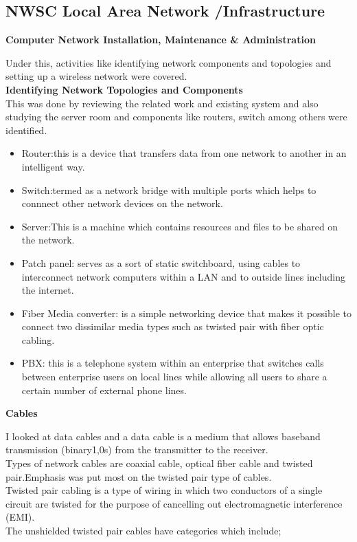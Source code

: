 \documentclass{article}
\begin{document}
\subsection{NWSC Local Area Network /Infrastructure}
\textbf{Computer Network Installation, Maintenance \& Administration}
\par Under this, activities like identifying network components and topologies and setting up a wireless network were covered.\\
\textbf{Identifying Network Topologies and Components}\\
This was done by reviewing the related work and existing system and also studying the server room and components like routers, switch among others were identified.
\begin{itemize}
\item Router:this is a device that transfers data from one network to another in an intelligent way.
\item Switch:termed as a network bridge with multiple ports which helps to connnect other network devices on the network.
\item Server:This is a machine which contains resources and files to be shared on the network.
\item Patch panel: serves as a sort of static switchboard, using cables to interconnect network computers within a LAN and to outside lines including the internet.
\item Fiber Media converter:  is a simple networking device that makes it possible to connect two dissimilar media types such as twisted pair with fiber optic cabling.
\item PBX: this is a telephone system within an enterprise that switches calls between enterprise users on local lines while allowing all users to share a certain number of external phone lines.
\end{itemize}
\textbf{Cables}
\par I looked at data cables and a data cable is a medium that allows baseband transmission (binary1,0s) from the transmitter to the receiver.\\
Types of network cables are coaxial cable, optical fiber cable and twisted pair.Emphasis was put most on the twisted pair type of cables.\\
Twisted pair cabling is a type of wiring in which two conductors of a single circuit are twisted for the purpose of cancelling out electromagnetic interference (EMI).\\
The unshielded twisted pair cables have categories which include;
\end{document}
